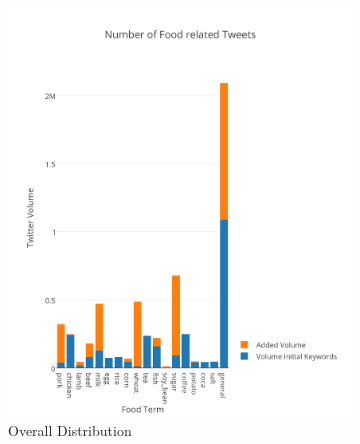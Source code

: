 \begin{figure}[H]
        \centering
        \begin{subfigure}[b]{0.5\textwidth}
                \includegraphics[width=\textwidth]{img/anal/exp_dist}
                \caption{Overall Distribution}
                \label{fig:world}
        \end{subfigure}%
        ~ %
        \begin{subfigure}[b]{0.5\textwidth}

\end{subfigure}
\end{figure}
